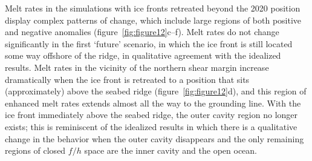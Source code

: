 \documentclass[draft]{agujournal2019}
\begin{document}
Melt rates in the simulations with ice fronts retreated beyond the 2020 position display complex patterns of change, which include large regions of both positive and negative anomalies (figure~\ref{fig:figure12}c--f). Melt rates do not change significantly in the first `future' scenario, in which the ice front is still located some way offshore of the ridge, in qualitative agreement with the idealized results. Melt rates in the vicinity of the northern shear margin increase dramatically when the ice front is retreated to a position that sits (approximately) above the seabed ridge (figure~\ref{fig:figure12}d), and this region of enhanced melt rates extends almost all the way to the grounding line. With the ice front immediately above the seabed ridge, the outer cavity region no longer exists; this is reminiscent of the idealized results in which there is a qualitative change in the behavior when the outer cavity disappears and the only remaining regions of closed $f/h$ space are the inner cavity and the open ocean.  %
\end{document}
